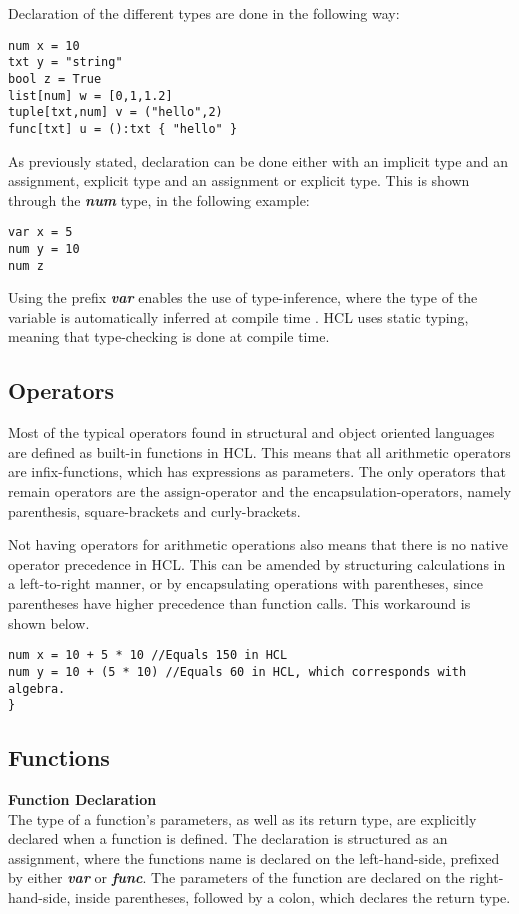 Declaration of the different types are done in the following way:
\begin{lstlisting}[language=HCL,label=lis:typedcls,firstnumber=1]
num x = 10
txt y = "string"
bool z = True
list[num] w = [0,1,1.2]
tuple[txt,num] v = ("hello",2)
func[txt] u = ():txt { "hello" }
\end{lstlisting}

As previously stated, declaration can be done either with an implicit type and an assignment, explicit type and an assignment or explicit type.
This is shown through the \textbf{\textit{num}} type, in the following example:

\begin{lstlisting}[language=HCL,label=lis:typedcls,firstnumber=1]
var x = 5
num y = 10
num z

\end{lstlisting}

Using the prefix \textbf{\textit{var}} enables the use of type-inference, where the type of the variable is automatically inferred at compile time \cite{typeinf}.
HCL uses static typing, meaning that type-checking is done at compile time.

\subsection{Operators}
Most of the typical operators found in structural and object oriented languages are defined as built-in functions in HCL.
This means that all arithmetic operators are infix-functions, which has expressions as parameters. 
The only operators that remain operators are the assign-operator and the encapsulation-operators, namely parenthesis, square-brackets and curly-brackets.

Not having operators for arithmetic operations also means that there is no native operator precedence in HCL.
This can be amended by structuring calculations in a left-to-right manner, or by encapsulating operations with parentheses, since parentheses have higher precedence than function calls. This workaround is shown below.

\begin{lstlisting}[language=HCL,firstnumber=1]
num x = 10 + 5 * 10 //Equals 150 in HCL
num y = 10 + (5 * 10) //Equals 60 in HCL, which corresponds with algebra.
}
\end{lstlisting}

\subsection{Functions}
\textbf{Function Declaration}\\
The type of a function's parameters, as well as its return type, are explicitly declared when a function is defined. 
The declaration is structured as an assignment, where the functions name is declared on the left-hand-side, prefixed by either \textbf{\textit{var}} or \textbf{\textit{func}}. 
The parameters of the function are declared on the right-hand-side, inside parentheses, followed by a colon, which declares the return type. 

